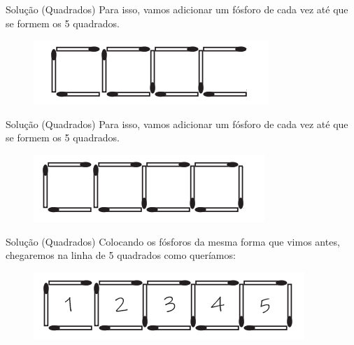\documentclass{beamer}
\begin{document}

\begin{frame}{Solução (Quadrados)}
Para isso, vamos adicionar um fósforo de cada vez até que se formem os 
5 quadrados. 
\begin{figure}[ht]
\centering
\includegraphics[width=.6\textwidth]{f2.png}
\label{fig:exampleFig2}
\end{figure}
\end{frame}



\begin{frame}{Solução (Quadrados)}
Para isso, vamos adicionar um fósforo de cada vez até que se formem os 
5 quadrados. 
\begin{figure}[ht]
\centering
\includegraphics[width=.6\textwidth]{f3.png}
\label{fig:exampleFig2}
\end{figure}
\end{frame}



\begin{frame}{Solução (Quadrados)}
Colocando os fósforos da mesma forma que vimos antes, chegaremos na linha de 5 quadrados como queríamos:  
\begin{figure}[ht]
\centering
\includegraphics[width=.6\textwidth]{f4.png}
\label{fig:exampleFig2}
\end{figure}
\end{frame}

\end{document}
